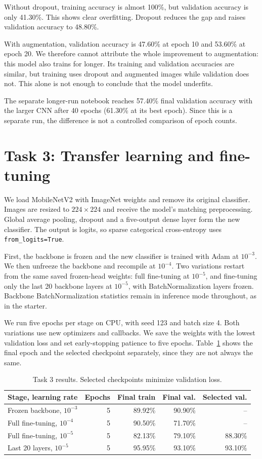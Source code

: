 \documentclass[11pt,a4paper]{article}
\begin{document}
Without dropout, training accuracy is almost 100\%, but validation accuracy is
only 41.30\%. This shows clear overfitting. Dropout reduces the gap and raises
validation accuracy to 48.80\%.

With augmentation, validation accuracy is 47.60\% at epoch 10 and 53.60\% at
epoch 20. We therefore cannot attribute the whole improvement to augmentation:
this model also trains for longer. Its training and validation accuracies are
similar, but training uses dropout and augmented images while validation does
not. This alone is not enough to conclude that the model underfits.

The separate longer-run notebook reaches 57.40\% final validation accuracy with
the larger CNN after 40 epochs (61.30\% at its best epoch). Since this is a
separate run, the difference is not a controlled comparison of epoch counts.

\clearpage
\section{Task 3: Transfer learning and fine-tuning}
We load MobileNetV2 with ImageNet weights and remove its original classifier.
Images are resized to $224\times224$ and receive the model's matching
preprocessing. Global average pooling, dropout and a five-output dense layer
form the new classifier. The output is logits, so sparse categorical
cross-entropy uses \texttt{from\_logits=True}.

First, the backbone is frozen and the new classifier is trained with Adam at
$10^{-3}$. We then unfreeze the backbone and recompile at $10^{-4}$. Two
variations restart from the same saved frozen-head weights: full fine-tuning at
$10^{-5}$, and fine-tuning only the last 20 backbone layers at $10^{-5}$, with
BatchNormalization layers frozen. Backbone BatchNormalization statistics remain
in inference mode throughout, as in the starter.

We run five epochs per stage on CPU, with seed 123 and batch size 4. Both
variations use new optimizers and callbacks. We save the weights with the
lowest validation loss and set early-stopping patience to five epochs.
Table~\ref{tab:transfer} shows the final epoch and the selected checkpoint
separately, since they are not always the same.

\begin{table}[ht]
\centering
\small
\caption{Task 3 results. Selected checkpoints minimize validation loss.}
\label{tab:transfer}
\begin{tabular}{lrrrr}
\toprule
Stage, learning rate & Epochs & Final train & Final val. & Selected val.\\
\midrule
Frozen backbone, $10^{-3}$ & 5 & 89.92\% & 90.90\% & --\\
Full fine-tuning, $10^{-4}$ & 5 & 90.50\% & 71.70\% & --\\
Full fine-tuning, $10^{-5}$ & 5 & 82.13\% & 79.10\% & 88.30\%\\
Last 20 layers, $10^{-5}$ & 5 & 95.95\% & 93.10\% & 93.10\%\\
\bottomrule
\end{tabular}
\end{table}
\end{document}
